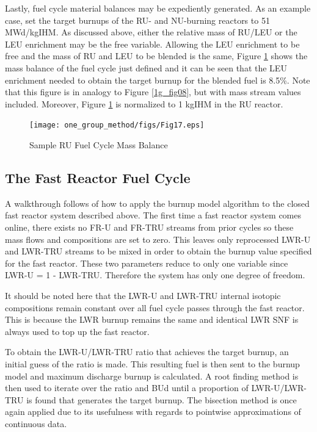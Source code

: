 Lastly, fuel cycle material balances may be expediently generated.   As an example case, set the 
target burnups of the RU- and NU-burning reactors to 51 MWd/kgIHM.  As discussed above, either the 
relative mass of RU/LEU or the LEU enrichment may be the free variable.  Allowing the LEU enrichment 
to be free and the mass of RU and LEU to be blended is the same,  Figure \ref{1g_fig17} shows the mass balance of 
the fuel cycle just defined and it can be seen that the LEU enrichment needed to obtain the 
target burnup for the blended fuel is 8.5\%.  Note that this figure is in analogy to Figure \ref{1g_fig08}, 
but with mass stream values included.  Moreover, Figure \ref{1g_fig17} is normalized to 1 kgIHM in the RU reactor.

\begin{figure}[htbp]
\caption{Sample RU Fuel Cycle Mass Balance}
\label{1g_fig17}
\begin{center}
\texttt{[image: one\_group\_method/figs/Fig17.eps]}
\end{center}
\end{figure}



\subsection{The Fast Reactor Fuel Cycle}
\label{1g_sec:FRFC}
A walkthrough follows of how to apply the burnup model algorithm to the closed fast reactor 
system described above.  The first time a fast reactor system comes online, there exists no 
FR-U and FR-TRU streams from prior cycles so these mass flows and compositions are set to zero.   
This leaves only reprocessed LWR-U and LWR-TRU streams to be mixed in order to obtain the burnup 
value specified for the fast reactor.  These two parameters reduce to only one 
variable since LWR-U = 1 - LWR-TRU.  Therefore the system has only one degree of freedom.  

It should be noted here that the LWR-U and LWR-TRU internal isotopic compositions remain constant 
over all fuel cycle passes through the fast reactor.  This is because the LWR burnup remains the 
same and identical LWR SNF is always used to top up the fast reactor.  

To obtain the LWR-U/LWR-TRU ratio that achieves the target burnup, an initial guess of the ratio 
is made.  This resulting fuel is then sent to the burnup model and maximum discharge burnup is 
calculated.  A root finding method is then used to iterate over the ratio and BUd until a 
proportion of LWR-U/LWR-TRU is found that generates the target burnup.  The bisection method 
is once again applied due to its usefulness with regards to pointwise approximations of continuous data.

